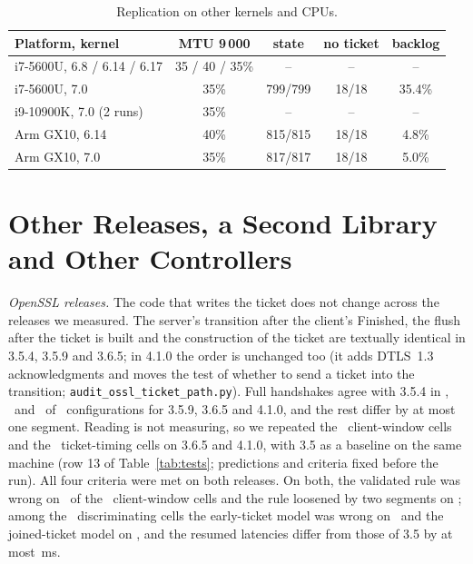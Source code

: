 \documentclass[sigconf,9pt,nonacm]{acmart}
\newcommand{\ms}{\,ms\xspace}
\begin{document}
\begin{table}[t]
\caption{Replication on other kernels and CPUs.}
\label{tab:repl}
\centering\footnotesize\setlength{\tabcolsep}{3pt}
\begin{tabular*}{\columnwidth}{@{\extracolsep{\fill}}lcccc@{}}
\toprule
Platform, kernel & MTU 9\,000 & state & no ticket & backlog\\
\midrule
i7-5600U, 6.8 / 6.14 / 6.17 & 35 / 40 / 35\% & -- & -- & --\\
i7-5600U, 7.0 & 35\% & 799/799 & 18/18 & 35.4\%\\
i9-10900K, 7.0 (2 runs) & 35\% & -- & -- & --\\
Arm GX10, 6.14 & 40\% & 815/815 & 18/18 & 4.8\%\\
Arm GX10, 7.0 & 35\% & 817/817 & 18/18 & 5.0\%\\
\bottomrule
\end{tabular*}
\end{table}

\section{Other Releases, a Second Library and Other Controllers}\label{sec:other}
\emph{OpenSSL releases.} The code that writes the ticket does not change across the releases we measured. The server's transition after the client's Finished, the flush after the ticket is built and the construction of the ticket are textually identical in 3.5.4, 3.5.9 and 3.6.5; in 4.1.0 the order is unchanged too (it adds DTLS~1.3 acknowledgments and moves the test of whether to send a ticket into the transition; \texttt{audit\_ossl\_ticket\_path.py}). Full handshakes agree with 3.5.4 in \OvTwoSame, \OvThreeSame\ and \OvFourSame\ of \OvTwoAll\ configurations for 3.5.9, 3.6.5 and 4.1.0, and the rest differ by at most one segment. Reading is not measuring, so we repeated the \CN\ client-window cells and the \DN\ ticket-timing cells on 3.6.5 and 4.1.0, with 3.5 as a baseline on the same machine (row 13 of Table~\ref{tab:tests}; predictions and criteria fixed before the run). All four criteria were met on both releases. On both, the validated rule was wrong on \GxFourCWrong\ of the \CN\ client-window cells and the rule loosened by two segments on \GxFourCLoose; among the \DDiff\ discriminating cells the early-ticket model was wrong on \GxFourDisEarly\ and the joined-ticket model on \GxFourDisJoined, and the resumed latencies differ from those of 3.5 by at most \GxMaxDiff\ms.
\end{document}

